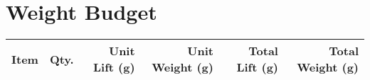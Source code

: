 \documentclass{article}
\begin{document}
\section{Weight Budget}

	\begin{tabular}{ l c r r r r }
		\textbf{Item} & \textbf{Qty.} & \textbf{Unit Lift (g)} & \textbf{Unit Weight (g)}  & \textbf{Total Lift (g)} & \textbf{Total Weight (g)}\\ \hline
	\end{tabular}
	
\end{document}
